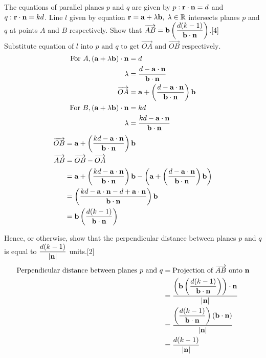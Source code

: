 \documentclass[12pt, a4 paper]{article}
\begin{document}
\begin{outline}[enumerate]
					\1 The equations of parallel planes $p$ and $q$ are given by $p:{\bf{r}} \cdot {\bf{n}} = d$ and $q:{\bf{r}} \cdot {\bf{n}} = kd$. Line $l$ given by equation ${\bf{r}} = {\bf{a}} + \lambda {\bf{b}},\;\lambda  \in \mathbb{R}$ intersects planes $p$ and $q$ at points $A$ and $B$ respectively.
					\2 Show that $\overrightarrow {AB}  = {\bf{b}}\left( {\dfrac{{d(k - 1)}}{{{\bf{b}} \cdot {\bf{n}}}}} \right)$.\hfill[4]
					\color{blue}\\
					${\textrm{Substitute equation of }}l{\textrm{ into }}p{\textrm{ and }}q{\textrm{ to get }}\overrightarrow {OA} {\textrm{ and }}\overrightarrow {OB} {\textrm{ respectively}}{\textrm{.}}$
					\begin{align*}
						{\textrm{For }}A,({\bf{a}} + \lambda {\bf{b}}) \cdot {\bf{n}} & = d \\\lambda  &= \frac{{d - {\bf{a}} \cdot {\bf{n}}}}{{{\bf{b}} \cdot {\bf{n}}}}\\\overrightarrow {OA}  &= {\bf{a}} + \left( {\frac{{d - {\bf{a}} \cdot {\bf{n}}}}{{{\bf{b}} \cdot {\bf{n}}}}} \right){\bf{b}}\\{\textrm{For }}B,({\bf{a}} + \lambda {\bf{b}}) \cdot {\bf{n}} &= kd\\\lambda &= \frac{{kd - {\bf{a}} \cdot {\bf{n}}}}{{{\bf{b}} \cdot {\bf{n}}}}
					\end{align*}
					\begin{align*}
						\overrightarrow {OB}  &= {\bf{a}} + \left( {\frac{{kd - {\bf{a}} \cdot {\bf{n}}}}{{{\bf{b}} \cdot {\bf{n}}}}} \right){\bf{b}}
						  \\\overrightarrow {AB}  &= \overrightarrow {OB}  - \overrightarrow {OA} \\ &= {\bf{a}} + \left( {\frac{{kd - {\bf{a}} \cdot {\bf{n}}}}{{{\bf{b}} \cdot {\bf{n}}}}} \right){\bf{b}} - \left( {{\bf{a}} + \left( {\frac{{d - {\bf{a}} \cdot {\bf{n}}}}{{{\bf{b}} \cdot {\bf{n}}}}} \right){\bf{b}}} \right)\\ &= \left( {\frac{{kd - {\bf{a}} \cdot {\bf{n}} - d + {\bf{a}} \cdot {\bf{n}}}}{{{\bf{b}} \cdot {\bf{n}}}}} \right){\bf{b}}\\ &= {\bf{b}}\left( {\frac{{d(k - 1)}}{{{\bf{b}} \cdot {\bf{n}}}}} \right)
					\end{align*}
					\color{black}
										
					\2 Hence, or otherwise, show that the perpendicular distance between planes $p$ and $q$ is equal to $\dfrac{{d(k - 1)}}{{\left| {\bf{n}} \right|}}$ units.\hfill[2]
					\color{blue}
					\begin{align*}
						{\textrm{Perpendicular distance between planes }}p{\textrm{ and }}q & = {\textrm{Projection of }}\overrightarrow {AB} {\textrm{ onto }}{\bf{n}} \\ &= \dfrac{{\left( {{\bf{b}}\left( {\dfrac{{d(k - 1)}}{{{\bf{b}} \cdot {\bf{n}}}}} \right)} \right) \cdot {\bf{n}}}}{{\left| {\bf{n}} \right|}}\\ &= \dfrac{{\left( {\dfrac{{d(k - 1)}}{{{\bf{b}} \cdot {\bf{n}}}}} \right)\left( {{\bf{b}} \cdot {\bf{n}}} \right)}}{{\left| {\bf{n}} \right|}}\\ &= \dfrac{{d(k - 1)}}{{\left| {\bf{n}} \right|}}
					\end{align*}
															

\end{outline}
\end{document}
